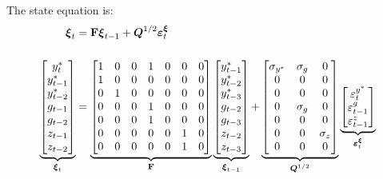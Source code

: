 \documentclass[a4paper,12pt]{article}
\begin{document}
\esq The state equation is:%
\begin{align}
\boldsymbol{\xi }_{t}& =\mathbf{F}\boldsymbol{\xi }_{t-1}+\boldsymbol{Q}%
^{1/2}\boldsymbol{\varepsilon }_{t}^{\boldsymbol{\xi }}  \notag \\[5mm]
\underbrace{%
\begin{bmatrix}
y_{t}^{\ast } \\ 
y_{t-1}^{\ast } \\ 
y_{t-2}^{\ast } \\ 
g_{t-1} \\ 
g_{t-2} \\ 
z_{t-1} \\ 
z_{t-2}%
\end{bmatrix}%
}_{\boldsymbol{\xi }_{t}}& =\underbrace{%
\begin{bmatrix}
1 & 0 & 0 & 1 & 0 & 0 & 0 \\ 
1 & 0 & 0 & 0 & 0 & 0 & 0 \\ 
0 & 1 & 0 & 0 & 0 & 0 & 0 \\ 
0 & 0 & 0 & 1 & 0 & 0 & 0 \\ 
0 & 0 & 0 & 1 & 0 & 0 & 0 \\ 
0 & 0 & 0 & 0 & 0 & 1 & 0 \\ 
0 & 0 & 0 & 0 & 0 & 1 & 0%
\end{bmatrix}%
}_{\mathbf{F}}\underbrace{%
\begin{bmatrix}
y_{t-1}^{\ast } \\ 
y_{t-2}^{\ast } \\ 
y_{t-3}^{\ast } \\ 
g_{t-2} \\ 
g_{t-3} \\ 
z_{t-2} \\ 
z_{t-3}%
\end{bmatrix}%
}_{\boldsymbol{\xi }_{t-1}}+\underbrace{%
\begin{bmatrix}
\sigma _{y^{\ast }} & \sigma _{g} & 0 \\ 
0 & 0 & 0 \\ 
0 & 0 & 0 \\ 
0 & \sigma _{g} & 0 \\ 
0 & 0 & 0 \\ 
0 & 0 & \sigma _{z} \\ 
0 & 0 & 0%
\end{bmatrix}%
}_{\boldsymbol{Q}^{1/2}}\underbrace{%
\begin{bmatrix}
\varepsilon _{t}^{y^{\ast }} \\ 
\varepsilon _{t-1}^{g} \\ 
\varepsilon _{t-1}^{z}%
\end{bmatrix}%
}_{\boldsymbol{\varepsilon }_{t}^{\boldsymbol{\xi }}}  \label{state1}
\end{align}
\end{document}
